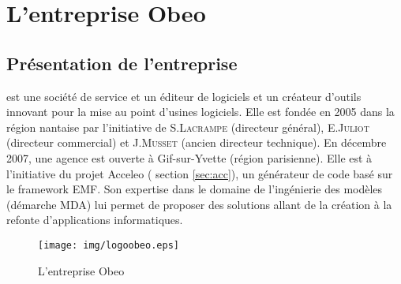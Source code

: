 

\chapter{L'entreprise Obeo}
\section{Présentation de l'entreprise}
\kwobeo{} est une société de service et un éditeur de logiciels et un créateur d'outils innovant pour la mise au point d'usines logiciels\cite{obeo}.  Elle est fondée en 2005 dans la région nantaise par l'initiative de S.\textsc{Lacrampe} (directeur général), E.\textsc{Juliot} (directeur commercial) et J.\textsc{Musset} (ancien directeur technique). En décembre 2007, une agence est ouverte à Gif-sur-Yvette (région parisienne). Elle est à l'initiative du projet Acceleo (\cf{} section \ref{sec:acc}), un générateur de code basé sur le framework EMF. Son expertise dans le domaine de l'ingénierie des modèles (démarche MDA) lui permet de proposer des solutions allant de la création à la refonte d'applications informatiques. 
\begin{figure}[htb]
  \centering
  \texttt{[image: img/logoobeo.eps]}
  \caption{L'entreprise Obeo}
\end{figure}


